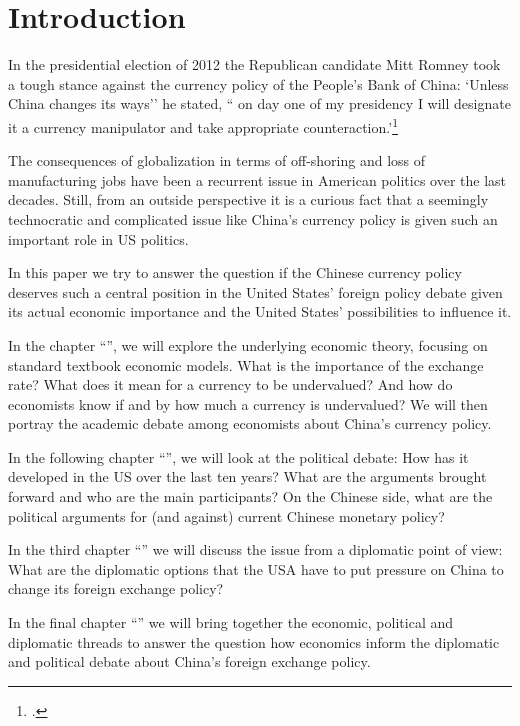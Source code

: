 \section{Introduction}
\label{sec:introduction}

In the presidential election of 2012 the Republican candidate Mitt 
Romney took a tough stance against the currency policy of the People's 
Bank of China: `Unless China changes its ways'' he stated, `` on day 
one of my presidency I will designate it a currency manipulator and take 
appropriate 
counteraction.'\footnote{\cite{Romney2012b}.}

The consequences of globalization in terms of off-shoring and loss of 
manufacturing jobs have been a recurrent issue in American politics over 
the last decades. Still, from an outside perspective it is a 
curious fact that a seemingly technocratic and complicated issue like 
China's currency policy is given such an important role in US politics.  

In this paper we try to answer the question if the Chinese currency 
policy deserves such a central position in the United States' foreign 
policy debate given its actual economic importance and the United 
States' possibilities to influence it.


In the chapter ``'', we will explore the 
underlying economic theory, focusing on standard textbook economic 
models.  What is the importance of the exchange rate?  What does it mean 
for a currency to be undervalued? And how do economists know if and by 
how much a currency is undervalued? We will then portray the academic 
debate among economists about China's currency policy. 

In the following chapter ``'', we will look at the 
political debate: How has it developed in the US over the last ten 
years?  What are the arguments brought forward and who are the main 
participants? On the Chinese side, what are the political arguments for 
(and against) current Chinese monetary policy?  

In the third chapter ``'' we will discuss the 
issue from a diplomatic point of view: What are the diplomatic options 
that the USA have to put pressure on China to change its foreign 
exchange policy? 

In the final chapter ``'' we will bring together 
the economic, political and diplomatic threads to answer the question 
how economics inform the diplomatic and political debate about China's 
foreign exchange policy. 
